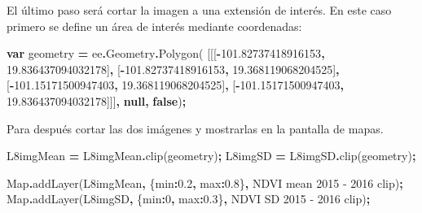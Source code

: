 \documentclass[
  12pt,
  letterpaper,
  twoside]{book}
\newenvironment{Shaded}{\begin{snugshade}}{\end{snugshade}}
\newcommand{\AttributeTok}[1]{\textcolor[rgb]{0.77,0.63,0.00}{#1}}
\newcommand{\BuiltInTok}[1]{#1}
\newcommand{\DataTypeTok}[1]{\textcolor[rgb]{0.13,0.29,0.53}{#1}}
\newcommand{\DecValTok}[1]{\textcolor[rgb]{0.00,0.00,0.81}{#1}}
\newcommand{\FloatTok}[1]{\textcolor[rgb]{0.00,0.00,0.81}{#1}}
\newcommand{\FunctionTok}[1]{\textcolor[rgb]{0.00,0.00,0.00}{#1}}
\newcommand{\KeywordTok}[1]{\textcolor[rgb]{0.13,0.29,0.53}{\textbf{#1}}}
\newcommand{\NormalTok}[1]{#1}
\newcommand{\OperatorTok}[1]{\textcolor[rgb]{0.81,0.36,0.00}{\textbf{#1}}}
\newcommand{\StringTok}[1]{\textcolor[rgb]{0.31,0.60,0.02}{#1}}
\begin{document}
El último paso será cortar la imagen a una extensión de interés. En este caso primero se define un área de interés mediante coordenadas:

\begin{Shaded}
\begin{Highlighting}[]
\KeywordTok{var}\NormalTok{ geometry }\OperatorTok{=}\NormalTok{ ee}\OperatorTok{.}\AttributeTok{Geometry}\OperatorTok{.}\FunctionTok{Polygon}\NormalTok{(}
\NormalTok{        [[[}\OperatorTok{{-}}\FloatTok{101.82737418916153}\OperatorTok{,} \FloatTok{19.836437094032178}\NormalTok{]}\OperatorTok{,}
\NormalTok{          [}\OperatorTok{{-}}\FloatTok{101.82737418916153}\OperatorTok{,} \FloatTok{19.368119068204525}\NormalTok{]}\OperatorTok{,}
\NormalTok{          [}\OperatorTok{{-}}\FloatTok{101.15171500947403}\OperatorTok{,} \FloatTok{19.368119068204525}\NormalTok{]}\OperatorTok{,}
\NormalTok{          [}\OperatorTok{{-}}\FloatTok{101.15171500947403}\OperatorTok{,} \FloatTok{19.836437094032178}\NormalTok{]]]}\OperatorTok{,} \KeywordTok{null}\OperatorTok{,} \KeywordTok{false}\NormalTok{)}\OperatorTok{;}
\end{Highlighting}
\end{Shaded}

Para después cortar las dos imágenes y mostrarlas en la pantalla de mapas.

\begin{Shaded}
\begin{Highlighting}[]
\NormalTok{L8imgMean }\OperatorTok{=}\NormalTok{ L8imgMean}\OperatorTok{.}\FunctionTok{clip}\NormalTok{(geometry)}\OperatorTok{;}
\NormalTok{L8imgSD }\OperatorTok{=}\NormalTok{ L8imgSD}\OperatorTok{.}\FunctionTok{clip}\NormalTok{(geometry)}\OperatorTok{;}

\BuiltInTok{Map}\OperatorTok{.}\FunctionTok{addLayer}\NormalTok{(L8imgMean}\OperatorTok{,}\NormalTok{ \{}\DataTypeTok{min}\OperatorTok{:}\FloatTok{0.2}\OperatorTok{,} \DataTypeTok{max}\OperatorTok{:}\FloatTok{0.8}\NormalTok{\}}\OperatorTok{,} \StringTok{\textquotesingle{}NDVI mean 2015 {-} 2016 clip\textquotesingle{}}\NormalTok{)}\OperatorTok{;}
\BuiltInTok{Map}\OperatorTok{.}\FunctionTok{addLayer}\NormalTok{(L8imgSD}\OperatorTok{,}\NormalTok{ \{}\DataTypeTok{min}\OperatorTok{:}\DecValTok{0}\OperatorTok{,} \DataTypeTok{max}\OperatorTok{:}\FloatTok{0.3}\NormalTok{\}}\OperatorTok{,} \StringTok{\textquotesingle{}NDVI SD 2015 {-} 2016 clip\textquotesingle{}}\NormalTok{)}\OperatorTok{;}
\end{Highlighting}
\end{Shaded}
\end{document}
